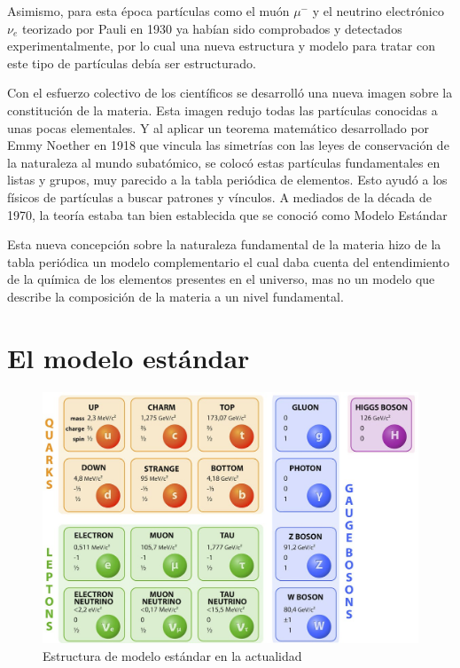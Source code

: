 \documentclass[journal]{IEEEtran}
\begin{document}
Asimismo, para esta época partículas como el muón $\mu^{-}$  y el neutrino electrónico $\nu_{e}$ teorizado por Pauli en 1930 ya habían sido comprobados y detectados experimentalmente, por lo cual una nueva estructura y modelo para tratar con este tipo de partículas debía ser estructurado.


 Con el esfuerzo colectivo de los científicos se desarrolló una nueva imagen sobre la constitución de la materia. Esta imagen redujo todas las partículas conocidas a unas pocas elementales. Y al aplicar un teorema matemático desarrollado por Emmy Noether en 1918 que vincula las simetrías con las leyes de conservación de la naturaleza al mundo subatómico, se colocó estas partículas fundamentales en listas y grupos, muy parecido a la tabla periódica de elementos. Esto ayudó a los físicos de partículas a buscar patrones y vínculos. A mediados de la década de 1970, la teoría estaba tan bien establecida que se conoció como Modelo Estándar~\cite{IOP}
 
 
 Esta nueva concepción sobre la naturaleza fundamental de la materia hizo de la tabla periódica un modelo complementario el cual daba cuenta del entendimiento de la química de los elementos presentes en el universo, mas no un modelo que describe la composición de la materia a un nivel fundamental.
 
 \section{El modelo estándar}
 
 
 
\begin{figure}[!htb]
\centering
\includegraphics[width=\linewidth,height=8 cm]{ModeloEstandar.png}
\caption{ Estructura de modelo estándar en la actualidad}
\label{Modelo Estandar}
\end{figure}
\end{document}

